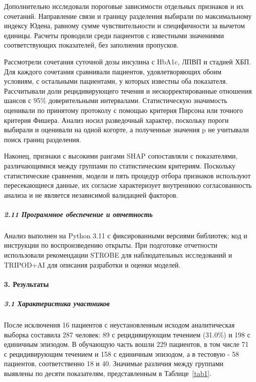 \documentclass{crm-article}
\begin{document}
Дополнительно исследовали пороговые зависимости отдельных признаков и их сочетаний. Направление связи и границу разделения выбирали по максимальному индексу Юдена, равному сумме чувствительности и специфичности за вычетом единицы. Расчеты проводили среди пациентов с известными значениями соответствующих показателей, без заполнения пропусков.

Рассмотрели сочетания суточной дозы инсулина с HbA1c, ЛПВП и стадией ХБП. Для каждого сочетания сравнивали пациентов, удовлетворяющих обоим условиям, с остальными пациентами, у которых известны оба показателя. Рассчитывали доли рецидивирующего течения и нескорректированные отношения шансов с 95\% доверительными интервалами. Статистическую значимость оценивали по принятому протоколу с помощью критерия Пирсона или точного критерия Фишера. Анализ носил разведочный характер, поскольку пороги выбирали и оценивали на одной когорте, а полученные значения p не учитывали поиск границ разделения.

Наконец, признаки с высокими рангами SHAP сопоставляли с показателями, различающимися между группами по статистическим критериям. Поскольку статистические сравнения, модели и пять процедур отбора признаков используют пересекающиеся данные, их согласие характеризует внутреннюю согласованность анализа и не является независимой валидацией факторов.

\subparagraph{2.11 Программное обеспечение и отчетность}\label{subsec2_11}

Анализ выполнен на Python 3.11 с фиксированными версиями библиотек; код и инструкции по воспроизведению открыты. При подготовке отчетности использовали рекомендации STROBE для наблюдательных исследований и TRIPOD+AI для описания разработки и оценки моделей.

\paragraph{3. Результаты}\label{sec3}

\subparagraph{3.1 Характеристика участников}\label{subsec3_1}

После исключения 16 пациентов с неустановленным исходом аналитическая выборка составила 287 человек: 89 с рецидивирующим течением (31.0\%) и 198 с единичным эпизодом. В обучающую часть вошли 229 пациентов, в том числе 71 с рецидивирующим течением и 158 с единичным эпизодом, а в тестовую - 58 пациентов, соответственно 18 и 40. Значимые различия между группами выявлены по десяти показателям, представленным в Таблице~\ref{tab1}.
\end{document}
